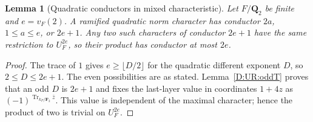 \documentclass[11pt]{amsart}
\newtheorem{lemma}[theorem]{Lemma}
\theoremstyle{definition}
\theoremstyle{remark}
\newcommand{\F}{\mathbf F}
\newcommand{\Tr}{\operatorname{Tr}}
\begin{document}
\begin{lemma}[Quadratic conductors in mixed characteristic]\label{U:quadratic-types}
Let $F/\mathbf Q_2$ be finite and $e=v_F(2)$. A ramified quadratic norm
character has conductor $2a$, $1\le a\le e$, or $2e+1$.
Any two such characters of conductor $2e+1$ have the same restriction to
$U_F^{2e}$, so their product has conductor at most $2e$.
\end{lemma}
\begin{proof}
The trace of $1$ gives $e\ge\lfloor D/2\rfloor$ for the quadratic
different exponent $D$, so $2\le D\le2e+1$. The even possibilities
are as stated. Lemma~\ref{D:UR:oddT} proves that an odd $D$ is
$2e+1$ and fixes the last-layer value in coordinates $1+4z$ as
$(-1)^{\Tr_{k_F/\F_2}\bar z}$. This value is independent of the
maximal character; hence the product of two is trivial on $U_F^{2e}$.
\end{proof}
\end{document}
